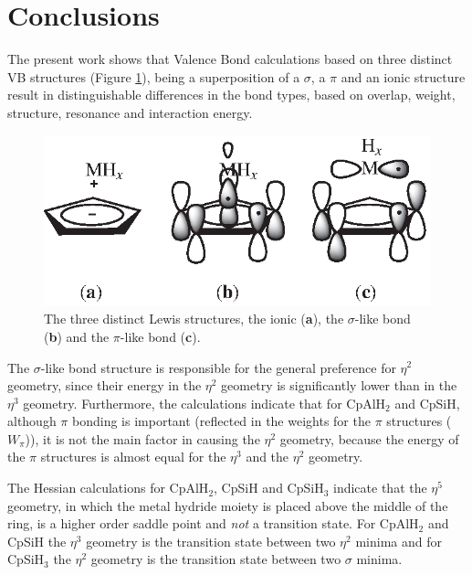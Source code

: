 \section{Conclusions}

The present work shows that Valence Bond calculations based on three distinct VB structures (Figure \ref{ch4.fig.lewis}), being a superposition of a $\sigma$, a $\pi$ and an ionic structure result in distinguishable differences in the bond types, based on overlap, weight, structure, resonance and interaction energy.
\begin{figure}[htp]
\begin{center}
\includegraphics{cyclopentadienyl/figures/lewis.eps}
\end{center}
\caption{The three distinct Lewis structures, the ionic (\textbf{a}), the $\sigma$-like bond (\textbf{b}) and
the $\pi$-like bond (\textbf{c}).}
\label{ch4.fig.lewis}
\end{figure}
The $\sigma$-like bond structure is responsible for the general preference for $\eta^{2}$ geometry, since their energy in the $\eta^2$ geometry is significantly lower than in the $\eta^3$ geometry. Furthermore, the calculations indicate that for CpAlH$_2$ and CpSiH, although $\pi$ bonding is important (reflected in the weights for the $\pi$ structures ($W_\pi$)), it is not the main factor in causing the $\eta^{2}$ geometry, because the energy of the $\pi$ structures is almost equal for the $\eta^3$ and the $\eta^2$ geometry. 

The Hessian calculations for CpAlH$_2$, CpSiH and CpSiH$_3$ indicate that the $\eta^5$ geometry, in which the metal hydride moiety is placed above the middle of the ring, is a higher order saddle point and \textit{not} a transition state. For CpAlH$_2$ and CpSiH the $\eta^3$ geometry is the transition state between two $\eta^2$ minima and for CpSiH$_3$ the $\eta^2$ geometry is the transition state between two $\sigma$ minima.

